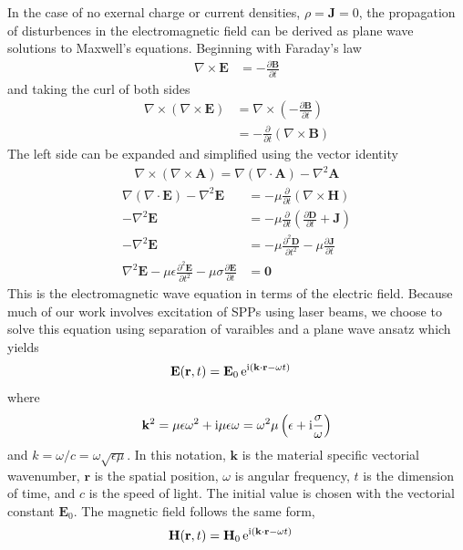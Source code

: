 In the case of no exernal charge or current densities, $\rho=\mathbf{J}=0$,
the propagation of disturbences in the electromagnetic field can be derived
as plane wave solutions to Maxwell's equations.  Beginning with Faraday's law
\begin{align}
\nabla \times \mathbf{E} &= -\frac{\partial \mathbf{B}} {\partial t}
\end{align}
and taking the curl of both sides
\begin{align}
\nabla \times
\left(\nabla\times\mathbf{E}\right)&=\nabla\times\left(-\frac{\partial\mathbf{B}}{\partial
t}\right)\\
&=-\frac{\partial}{\partial t}\left(\nabla \times \mathbf{B}\right)
\end{align}
The left side can be expanded and simplified using the vector identity
\begin{align}
\nabla \times \left( \nabla \times \mathbf{A} \right) = \nabla \left(
\nabla \cdot \mathbf{A} \right) - \nabla^2 \mathbf{A}
\end{align}
\begin{align}
\nabla\left(\nabla\cdot\mathbf{E}\right)-\nabla^2\mathbf{E}
&=-\mu\frac{\partial}{\partial t}\left(\nabla \times \mathbf{H}\right)\\
-\nabla^2\mathbf{E}&=-\mu\frac{\partial}{\partial t}\left( \frac{\partial \mathbf{D}}{\partial t} + \mathbf{J}\right) \\
-\nabla^2\mathbf{E}&=-\mu\frac{\partial^2 \mathbf{D}}{\partial t^2} -\mu\frac{\partial\mathbf{J}}{\partial t} \\
\nabla^2\mathbf{E} -\mu\epsilon\frac{\partial^2 \mathbf{E}}{\partial t^2} -\mu\sigma\frac{\partial\mathbf{E}}{\partial t}  &= \mathbf{0} 
\label{eqn:ewe}
\end{align}
This is the electromagnetic wave equation in terms of the electric field.
Because much of our work involves excitation of SPPs using laser beams, we 
choose to solve this equation using separation of varaibles and a plane wave
ansatz which yields
\begin{align}
 \mathbf{E} ( \mathbf{r}, t ) &= \mathbf{E}_0\, {\mathrm{e}}^{{\mathrm{i}} (\mathbf{k}
 \cdot \mathbf{r} - \omega t )}
\label{eqn:planewaves}
\end{align}
where
\begin{equation}
 \mathbf{k}^2 = \mu \epsilon \omega^2 + {\mathrm{i}} \mu \epsilon \omega = \omega^2 \mu \left(\epsilon + {\mathrm{i}} \frac{\sigma}{\omega}\right)
 \label{eqn:planewavedispersion}
\end{equation}
and $k=\omega/c=\omega\sqrt{\epsilon\mu}$.  In this notation,
$\mathbf{k}$ is the material specific vectorial wavenumber, $\mathbf{r}$ is the
spatial position, $\omega$ is angular frequency, $t$ is
the dimension of time, and $c$ is the speed of light.
The initial value is chosen with the vectorial constant $\mathbf{E}_0$.
The magnetic field follows the same form,
\begin{align}
 \mathbf{H} ( \mathbf{r}, t ) &= \mathbf{H}_0\, {\mathrm{e}}^{{\mathrm{i}} (\mathbf{k}
 \cdot \mathbf{r} - \omega t )}
\end{align}
